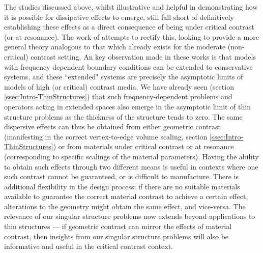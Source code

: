 The studies discussed above, whilst illustrative and helpful in demonstrating how it is possible for dissipative effects to emerge, still fall short of definitively establishing these effects as a direct consequence of being under critical contrast (or at resonance).
The work of \cite{cherednichenko2019unified, cherednichenko2019time} attempts to rectify this, looking to provide a more general theory analogous to that which already exists for the moderate (non-critical) contrast setting.
An key observation made in these works is that models with frequency dependent boundary conditions can be extended to conservative systems, and these ``extended" systems are precisely the asymptotic limits of models of high (or critical) contrast media. %
We have already seen (section \ref{ssec:Intro-ThinStructures}) that such frequency-dependent problems and operators acting in extended spaces also emerge in the asymptotic limit of thin structure problems as the thickness of the structure tends to zero.
The same dispersive effects can thus be obtained from either geometric contrast (manifesting in the correct vertex-to-edge volume scaling, section \ref{ssec:Intro-ThinStructures}) or from materials under critical contrast or at resonance (corresponding to specific scalings of the material parameters).
Having the ability to obtain such effects through two different means is useful in contexts where one such contrast cannot be guaranteed, or is difficult to manufacture.
There is additional flexibility in the design process: if there are no suitable materials available to guarantee the correct material contrast to achieve a certain effect, alterations to the geometry might obtain the same effect, and vice-versa.
The relevance of our singular structure problems now extends beyond applications to thin structures --- if geometric contrast can mirror the effects of material contrast, then insights from our singular structure problems will also be informative and useful in the critical contrast context.